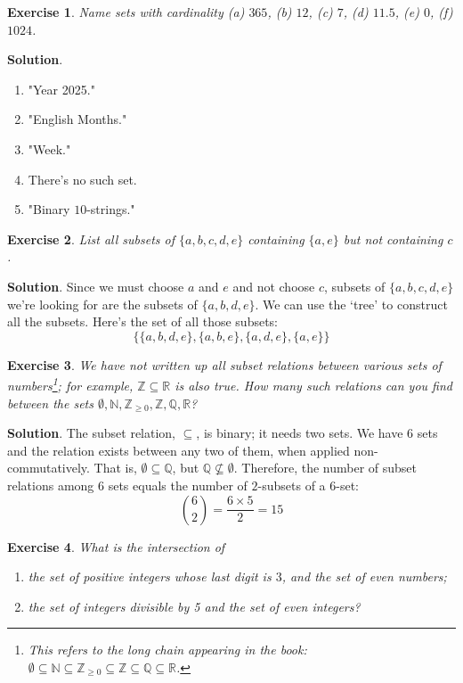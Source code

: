 \documentclass[11pt]{book}
\theoremstyle{definition}
\theoremstyle{plain}
\newtheorem{exercise}{Exercise}
\theoremstyle{definition}
\theoremstyle{problemstyle}
\theoremstyle{remark}
\theoremstyle{definition}
\begin{document}
\begin{exercise}
    \label{ex:1.8.9}
    Name sets with cardinality (a) $365$, (b) $12$, (c) $7$, (d) $11.5$, (e) $0$, (f) $1024$.
\end{exercise}
\textbf{Solution}.
\begin{enumerate}[label=\arabic*)]
    \item "Year 2025."
    \item "English Months."
    \item "Week."
    \item There's no such set.
    \item "Binary $10$-strings."
\end{enumerate}
\begin{exercise}
    \label{ex:1.8.10}
    List all subsets of $\{a,b,c,d,e\}$ containing $\{a,e\}$ but not containing $c$.
\end{exercise}
\textbf{Solution}. Since we must choose $a$ and $e$ and not choose $c$, subsets of $\{a,b,c,d,e\}$ we're looking for are the subsets of $\{a,b,d,e\}$. We can use the `tree' to construct all the subsets. Here's the set of all those subsets:
\[
    \{\{a,b,d,e\},\{a,b,e\},\{a,d,e\},\{a,e\}\}
\]
\begin{exercise}
    \label{ex:1.8.11}
    We have not written up all subset relations between various sets of numbers\footnote{This refers to the long chain appearing in the book: $\emptyset\subseteq\mathbb{N}\subseteq\mathbb{Z}_{\geq0}\subseteq\mathbb{Z}\subseteq\mathbb{Q}\subseteq\mathbb{R}$.}; for example, $\mathbb{Z}\subseteq\mathbb{R}$ is also true. How many such relations can you find between the sets $\emptyset,\mathbb{N},\mathbb{Z}_{\geq0},\mathbb{Z},\mathbb{Q},\mathbb{R}$?
\end{exercise}
\textbf{Solution}.
The subset relation, $\subseteq$, is binary; it needs two sets. We have $6$ sets and the relation exists between any two of them, when applied non-commutatively. That is, $\emptyset\subseteq\mathbb{Q}$, but $\mathbb{Q}\not\subseteq\emptyset$. Therefore, the number of subset relations among $6$ sets equals the number of $2$-subsets of a $6$-set:
\[
    \binom{6}{2}=\frac{6\times5}{2}=15
\]
\begin{exercise}
    \label{ex:1.8.12}
    What is the intersection of
    \begin{enumerate}[label=\alph*)]
        \item the set of positive integers whose last digit is $3$, and the set of even numbers;
        \item the set of integers divisible by 5 and the set of even integers?
    \end{enumerate}
\end{exercise}
\end{document}
